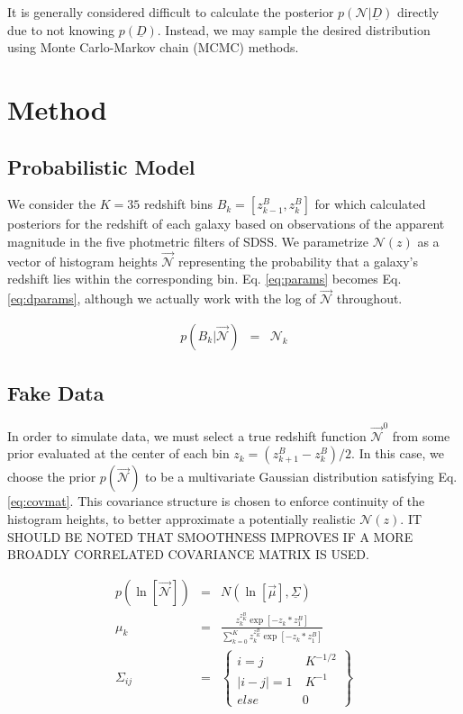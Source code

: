 \documentclass[12pt, onecolumn]{emulateapj}
\newcommand{\textul}{\underline}
\begin{document}
It is generally considered difficult to calculate the posterior $p(\mathcal{N}|\textul{D})$ directly due to not knowing $p(\textul{D})$.  Instead, we may sample the desired distribution using Monte Carlo-Markov chain (MCMC) methods.  

\section{Method}

\subsection{Probabilistic Model}

We consider the $K=35$ redshift bins $B_{k}=[z^{B}_{k-1},z^{B}_{k}]$ for which \citet{she11} calculated posteriors for the redshift of each galaxy based on observations of the apparent magnitude in the five photmetric filters of SDSS.  We parametrize $\mathcal{N}(z)$ as a vector of histogram heights $\vec{\mathcal{N}}$ representing the probability that a galaxy's redshift lies within the corresponding bin.  Eq. \ref{eq:params} becomes Eq. \ref{eq:dparams}, although we actually work with the log of $\vec{\mathcal{N}}$ throughout.  

\begin{eqnarray}
\label{eq:dparams}
p(B_{k}|\vec{\mathcal{N}}) &=& \mathcal{N}_{k}%
\end{eqnarray}

\subsection{Fake Data}
\label{sec:fake}

In order to simulate data, we must select a true redshift function $\vec{\mathcal{N}}^{0}$ from some prior evaluated at the center of each bin $z_{k}=(z_{k+1}^{B}-z_{k}^{B})/2$.  In this case, we choose the prior $p(\vec{\mathcal{N}})$ to be a multivariate Gaussian distribution satisfying Eq. \ref{eq:covmat}.  This covariance structure is chosen to enforce continuity of the histogram heights, to better approximate a potentially realistic $\mathcal{N}(z)$.  IT SHOULD BE NOTED THAT SMOOTHNESS IMPROVES IF A MORE BROADLY CORRELATED COVARIANCE MATRIX IS USED.

\begin{mathletters}
\begin{eqnarray}
\label{eq:covmat}
p(\ln[\vec{\mathcal{N}}]) &=& N(\ln[\vec{\mu}],\textul{\Sigma})\\
\mu_{k} &=& \frac{z_{k}^{z_{K}^{B}}\exp[-z_{k}*z_{1}^{B}]}{\sum_{k=0}^{K}z_{k}^{z_{K}^{B}}\exp[-z_{k}*z_{1}^{B}]}\nonumber\\
\Sigma_{ij} &=& \left\{\begin{array}{cc}i=j&\ K^{-1/2}\\|i-j|=1&\ K^{-1}\\else&0\end{array}\right\}\nonumber
\end{eqnarray}
\end{mathletters}
\end{document}

